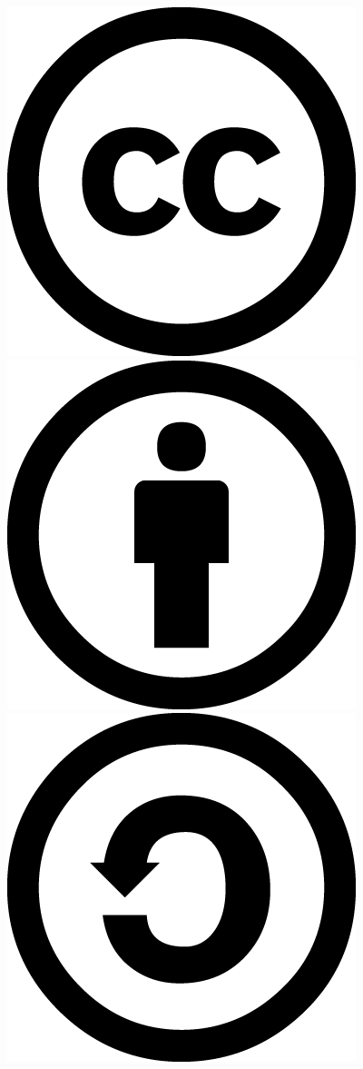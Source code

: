 \begin{center}
    \includegraphics[scale=0.15]{creative-commons/cc-large}
    \includegraphics[scale=0.15]{creative-commons/by-large}
    \includegraphics[scale=0.15]{creative-commons/sa-large}
\end{center}

